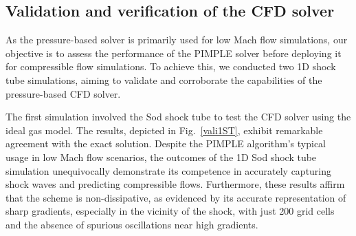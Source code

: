     \subsection{Validation and verification of the CFD solver} \label{App:vali:CFD}
As the pressure-based solver is primarily used for low Mach flow simulations, our objective is to assess the performance of the PIMPLE solver before deploying it for compressible flow simulations. To achieve this, we conducted two 1D shock tube simulations, aiming to validate and corroborate the capabilities of the pressure-based CFD solver.

The first simulation involved the Sod shock tube \cite{sod1978survey} to test the CFD solver using the ideal gas model. The results, depicted in Fig.~\ref{vali1ST}, exhibit remarkable agreement with the exact solution. Despite the PIMPLE algorithm's typical usage in low Mach flow scenarios, the outcomes of the 1D Sod shock tube simulation unequivocally demonstrate its competence in accurately capturing shock waves and predicting compressible flows. Furthermore, these results affirm that the scheme is non-dissipative, as evidenced by its accurate representation of sharp gradients, especially in the vicinity of the shock, with just 200 grid cells and the absence of spurious oscillations near high gradients.


